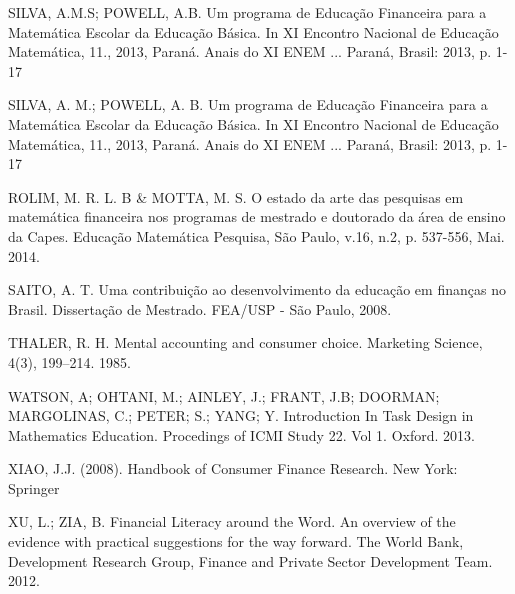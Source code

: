 SILVA, A.M.S; POWELL, A.B. Um programa de Educação Financeira para a Matemática Escolar da Educação Básica. In XI Encontro Nacional de Educação Matemática, 11., 2013, Paraná. Anais do XI ENEM ... Paraná, Brasil: 2013, p. 1-17

SILVA, A. M.; POWELL, A. B. Um programa de Educação Financeira para a Matemática Escolar da Educação Básica. In XI Encontro Nacional de Educação Matemática, 11., 2013, Paraná. Anais do XI ENEM ... Paraná, Brasil: 2013, p. 1-17

ROLIM, M. R. L. B \& MOTTA, M. S. O estado da arte das pesquisas em matemática financeira nos programas de mestrado e doutorado da área de ensino da Capes. Educação Matemática Pesquisa, São Paulo, v.16, n.2, p. 537-556, Mai. 2014.

SAITO, A. T. Uma contribuição ao desenvolvimento da educação em finanças no Brasil. Dissertação de Mestrado. FEA/USP - São Paulo, 2008.

THALER, R. H. Mental accounting and consumer choice. Marketing Science, 4(3), 199–214. 1985.

WATSON, A; OHTANI, M.; AINLEY, J.; FRANT, J.B; DOORMAN; MARGOLINAS, C.; PETER; S.; YANG; Y. Introduction In Task Design in Mathematics Education. Procedings of ICMI Study 22. Vol 1. Oxford. 2013.

XIAO, J.J. (2008). Handbook of Consumer Finance Research. New York: Springer

XU, L.; ZIA, B. Financial Literacy around the Word. An overview of the evidence with practical suggestions for the way forward. The World Bank, Development Research Group, Finance and Private Sector Development Team. 2012.


